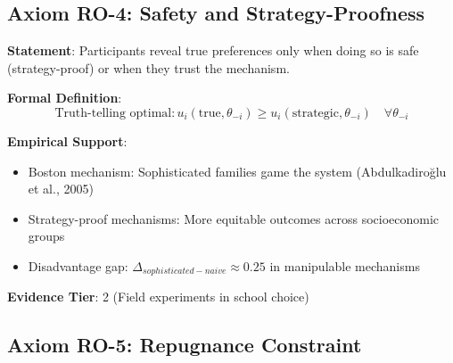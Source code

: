 \subsection{Axiom RO-4: Safety and Strategy-Proofness}

\begin{tcolorbox}[colback=blue!5!white,colframe=blue!75!black,title=Axiom RO-4: Safety and Strategy-Proofness]
\textbf{Statement}: Participants reveal true preferences only when doing so is safe (strategy-proof) or when they trust the mechanism.

\textbf{Formal Definition}:
\begin{equation}
\text{Truth-telling optimal}: u_i(\text{true}, \theta_{-i}) \geq u_i(\text{strategic}, \theta_{-i}) \quad \forall \theta_{-i}
\end{equation}

\textbf{Empirical Support}:
\begin{itemize}
    \item Boston mechanism: Sophisticated families game the system (Abdulkadiroğlu et al., 2005)
    \item Strategy-proof mechanisms: More equitable outcomes across socioeconomic groups
    \item Disadvantage gap: $\Delta_{sophisticated-naive} \approx 0.25$ in manipulable mechanisms
\end{itemize}

\textbf{Evidence Tier}: 2 (Field experiments in school choice)
\end{tcolorbox}

\subsection{Axiom RO-5: Repugnance Constraint}


